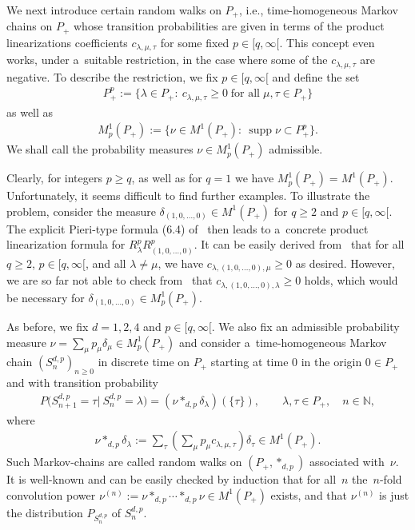 \documentclass[pdftex]{sigma}
\numberwithin{equation}{section}
\DeclareMathOperator{\supp}{supp}
\begin{document}
We next introduce certain random walks on $P_+$, i.e., time-homogeneous Markov chains on $P_+$ whose transition
probabilities are given in terms of the product linearizations coef\/f\/icients $c_{\lambda,\mu,\tau}$ for some f\/ixed
$p\in[q,\infty[$.
This concept even works, under a~suitable restriction, in the case where some of the $c_{\lambda,\mu,\tau}$ are negative.
To describe the restriction, we f\/ix $p\in[q,\infty[$ and def\/ine the set
\begin{gather*}
P_+^p:=\{\lambda\in P_+:\> c_{\lambda,\mu,\tau}\ge0
\;
\text{for all}
\;
\mu,\tau\in P_+\}
\end{gather*}
as well as
\begin{gather*}
M^1_p(P_+):=\big\{\nu\in M^1(P_+):\> \supp \nu\subset P_+^p\big\}.
\end{gather*}
We shall call the probability measures $\nu\in M^1_p(P_+)$ admissible.

Clearly, for integers $p\ge q$, as well as for $q=1$ we have $M^1_p(P_+)=M^1(P_+)$.
Unfortunately, it seems dif\/f\/icult to f\/ind further examples.
To illustrate the problem, consider the measure $\delta_{(1,0,\ldots,0)}\in M^1(P_+)$ for $q\ge 2$ and $p\in[q,\infty[$.
The explicit Pieri-type formula (6.4) of~\cite{D} then leads to a~concrete product linearization formula for
$R_\lambda^p  R_{(1,0,\ldots,0)}^p$.
It can be easily derived from~\cite{D} that for all $q\ge 2$, $p\in[q,\infty[$, and all $\lambda\ne \mu$, we have
$c_{\lambda,(1,0,\ldots,0), \mu}\ge0$ as desired.
However, we are so far not able to check from~\cite{D} that $c_{\lambda,(1,0,\ldots,0), \lambda}\ge0$ holds, which would
be necessary for $\delta_{(1,0,\ldots,0)}\in M^1_p(P_+)$.

As before, we f\/ix $d=1,2,4$ and $p\in [q,\infty[$.
We also f\/ix an admissible probability measure $\nu=\sum\limits_\mu p_\mu\delta_\mu\in M^1_p(P_+)$ and consider
a~time-homogeneous Markov chain $(S_n^{d,p})_{n\ge0}$ in discrete time on $P_+$ starting at time $0$ in the origin $0\in
P_+$ and with transition probability
\begin{gather*}
P\big(S_{n+1}^{d,p}=\tau|\> S_n^{d,p}
=\lambda\big)=(\nu*_{d,p}\delta_\lambda)(\{\tau\}),
\qquad
\lambda,\tau\in P_+,
\quad
n\in\mathbb N,
\end{gather*}
where
\begin{gather*}
\nu*_{d,p}\delta_\lambda:= \sum\limits_\tau \left(\sum\limits_\mu p_\mu c_{\lambda,\mu,\tau}\right) \delta_\tau\in M^1(P_+).
\end{gather*}
Such Markov-chains are called random walks on $(P_+,*_{d,p})$ associated with~$\nu$.
It is well-known and can be easily checked by induction that for all~$n$ the~$n$-fold convolution power
$\nu^{(n)}:=\nu*_{d,p}\cdots *_{d,p}\nu\in M^1(P_+)$ exists, and that $\nu^{(n)}$ is just the distribution
$P_{S_n^{d,p}}$ of $S_n^{d,p}$.
\end{document}
